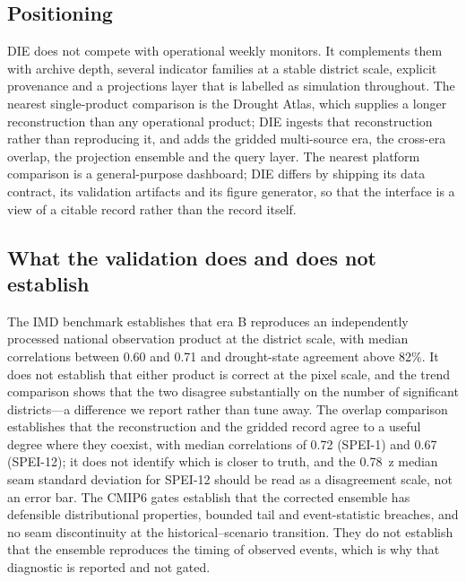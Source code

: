 \documentclass[10pt,a4paper]{article}
\begin{document}
\subsection*{Positioning}
DIE does not compete with operational weekly monitors. It complements them with archive depth, several indicator families at a stable district scale, explicit provenance and a projections layer that is labelled as simulation throughout. The nearest single-product comparison is the Drought Atlas, which supplies a longer reconstruction than any operational product; DIE ingests that reconstruction rather than reproducing it, and adds the gridded multi-source era, the cross-era overlap, the projection ensemble and the query layer. The nearest platform comparison is a general-purpose dashboard; DIE differs by shipping its data contract, its validation artifacts and its figure generator, so that the interface is a view of a citable record rather than the record itself.

\subsection*{What the validation does and does not establish}
The IMD benchmark establishes that era B reproduces an independently processed national observation product at the district scale, with median correlations between 0.60 and 0.71 and drought-state agreement above 82\%. It does not establish that either product is correct at the pixel scale, and the trend comparison shows that the two disagree substantially on the number of significant districts---a difference we report rather than tune away. The overlap comparison establishes that the reconstruction and the gridded record agree to a useful degree where they coexist, with median correlations of 0.72 (SPEI-1) and 0.67 (SPEI-12); it does not identify which is closer to truth, and the 0.78~z median seam standard deviation for SPEI-12 should be read as a disagreement scale, not an error bar. The CMIP6 gates establish that the corrected ensemble has defensible distributional properties, bounded tail and event-statistic breaches, and no seam discontinuity at the historical--scenario transition. They do not establish that the ensemble reproduces the timing of observed events, which is why that diagnostic is reported and not gated.
\end{document}
